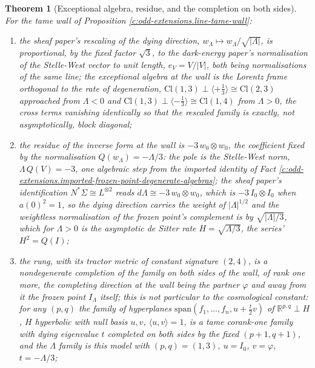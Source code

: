\documentclass[11pt]{article}
\newtheorem{theorem}{Theorem}[section]
\theoremstyle{definition}
\theoremstyle{plain}
\newcommand{\changedmark}[2]{\marginpar{\raggedright\scriptsize\color{#1}#2}}
\providecommand{\Cl}{}\renewcommand{\Cl}{\mathrm{Cl}}
\providecommand{\R}{}\renewcommand{\R}{\mathbb{R}}
\providecommand{\ip}{}\renewcommand{\ip}[2]{\langle #1, #2\rangle}
\begin{document}
\begin{theorem}[Exceptional algebra, residue, and the completion on both sides]\label{c:odd-extensions.exceptional-algebra-residue-completion-both-sides}
\changedmark{gray}{reworded}
For the tame wall of Proposition \ref{c:odd-extensions.line-tame-wall}:
\begin{enumerate}
\item[(i)] the sheaf paper's rescaling of the dying direction, $w_{\Lambda} \mapsto w_{\Lambda}/\sqrt{|\Lambda|}$, is proportional, by the fixed factor $\sqrt 3$, to the dark-energy paper's normalisation of the Stelle-West vector to unit length, $e_{V} = V/|V|$, both being normalisations of the same line; the exceptional algebra at the wall is the Lorentz frame orthogonal to the rate of degeneration, $\Cl(1,3) \perp \langle +\tfrac13\rangle \cong \Cl(2,3)$ approached from $\Lambda < 0$ and $\Cl(1,3) \perp \langle -\tfrac13\rangle \cong \Cl(1,4)$ from $\Lambda > 0$, the cross terms vanishing identically so that the rescaled family is exactly, not asymptotically, block diagonal;
\item[(ii)] the residue of the inverse form at the wall is $-3\,w_{0} \otimes w_{0}$, the coefficient fixed by the normalisation $Q(w_{\Lambda}) = -\Lambda/3$: the pole is the Stelle-West norm, $\Lambda\,Q(V) = -3$, one algebraic step from the imported identity of Fact \ref{c:odd-extensions.imported-frozen-point-degenerate-algebras}; the sheaf paper's identification $N^{*}\Sigma \cong L^{\otimes 2}$ reads $d\Lambda \cong -3\, w_{0} \otimes w_{0}$, which is $-3\,I_{0} \otimes I_{0}$ when $a(0)^{2} = 1$, so the dying direction carries the weight of $|\Lambda|^{1/2}$ and the weightless normalisation of the frozen point's complement is by $\sqrt{|\Lambda|/3}$, which for $\Lambda > 0$ is the asymptotic de Sitter rate $H = \sqrt{\Lambda/3}$, the series' $H^{2} = Q(I)$;
\item[(iii)] the rung, with its tractor metric of constant signature $(2,4)$, is a nondegenerate completion of the family on both sides of the wall, of rank one more, the completing direction at the wall being the partner $\varphi$ and away from it the frozen point $I_{\Lambda}$ itself; this is not particular to the cosmological constant: for any $(p,q)$ the family of hyperplanes $\mathrm{span}(f_{1}, \ldots, f_{n}, u + \tfrac{t}{2}v)$ of $\R^{p,q} \perp H$, $H$ hyperbolic with null basis $u, v$, $\ip{u}{v} = 1$, is a tame corank-one family with dying eigenvalue $t$ completed on both sides by the fixed $(p+1,q+1)$, and the $\Lambda$ family is this model with $(p,q) = (1,3)$, $u = I_{0}$, $v = \varphi$, $t = -\Lambda/3$;

\end{enumerate}
\end{theorem}
\end{document}
